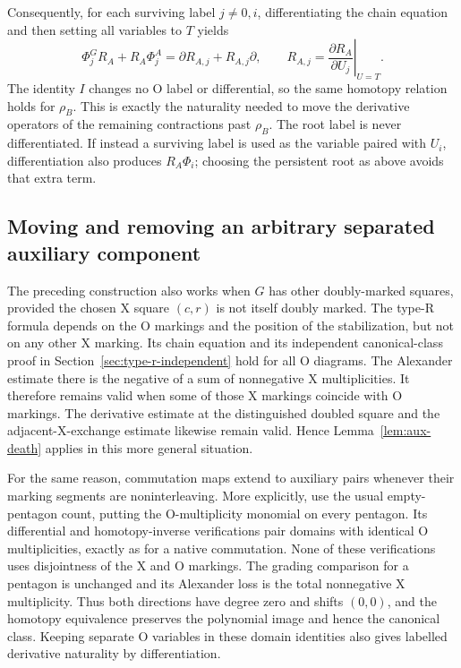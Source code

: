 \documentclass[11pt,a4paper]{article}
\theoremstyle{remark}
\begin{document}
Consequently, for each surviving label $j\ne0,i$, differentiating the
chain equation and then setting all variables to $T$ yields
\[
 \Phi_j^G R_A+R_A\Phi_j^A
 =\partial R_{A,j}+R_{A,j}\partial,
 \qquad
 R_{A,j}=\left.\frac{\partial R_A}{\partial U_j}\right|_{U=T}.
\]
The identity $I$ changes no O label or differential, so the same
homotopy relation holds for $\rho_B$.  This is exactly the naturality
needed to move the derivative operators of the remaining contractions
past $\rho_B$.  The root label is never differentiated.  If instead a
surviving label is used as the variable paired with $U_i$, differentiation
also produces $R_A\Phi_i$; choosing the persistent root as above avoids
that extra term.

\subsection{Moving and removing an arbitrary separated auxiliary component}

The preceding construction also works when $G$ has other doubly-marked
squares, provided the chosen X square $(c,r)$ is not itself doubly
marked.  The type-R formula depends on the O markings and the
position of the stabilization, but not on any other X marking.
Its chain equation and its independent canonical-class proof in
Section~\ref{sec:type-r-independent} hold for all O diagrams.
The Alexander estimate there is the negative of a sum of
nonnegative X multiplicities.  It therefore remains valid when some
of those X markings coincide with O markings.  The derivative estimate
at the distinguished doubled square and the adjacent-X-exchange
estimate likewise remain valid.  Hence Lemma~\ref{lem:aux-death}
applies in this more general situation.

For the same reason, commutation maps extend to auxiliary pairs whenever
their marking segments are noninterleaving.  More explicitly, use the
usual empty-pentagon count, putting the O-multiplicity monomial on every
pentagon.  Its differential and homotopy-inverse verifications pair
domains with identical O multiplicities, exactly as for a native
commutation.  None of these verifications uses disjointness of the X and
O markings.  The grading comparison for a pentagon is unchanged and its
Alexander loss is the total nonnegative X multiplicity.  Thus both
directions have degree zero and shifts $(0,0)$, and the homotopy
equivalence preserves the polynomial image and hence the canonical
class.  Keeping separate O variables in these domain identities also
gives labelled derivative naturality by differentiation.
\end{document}
